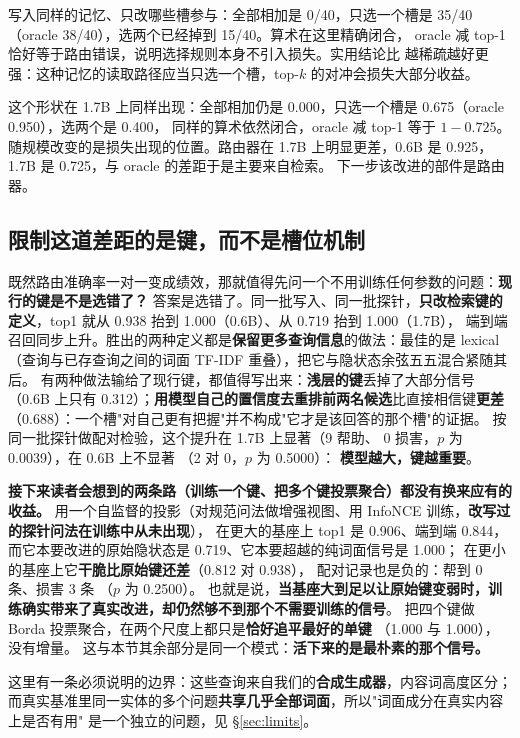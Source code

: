\documentclass[11pt]{ctexart}
\begin{document}
写入同样的记忆、只改哪些槽参与：全部相加是 0/40，只选一个槽是 35/40
（oracle 38/40），选两个已经掉到 15/40。算术在这里精确闭合，
oracle 减 top-1 恰好等于路由错误，说明选择规则本身不引入损失。实用结论比
越稀疏越好更强：这种记忆的读取路径应当只选一个槽，top-$k$ 的对冲会损失大部分收益。

这个形状在 1.7B 上同样出现：全部相加仍是 0.000，只选一个槽是
0.675（oracle 0.950），选两个是 0.400，
同样的算术依然闭合，oracle 减 top-1 等于 $1 - 0.725$。
随规模改变的是损失出现的位置。路由器在 1.7B 上明显更差，0.6B 是 0.925，
1.7B 是 0.725，与 oracle 的差距于是主要来自检索。
下一步该改进的部件是路由器。

\subsection{限制这道差距的是键，而不是槽位机制}
既然路由准确率一对一变成绩效，那就值得先问一个不用训练任何参数的问题：\textbf{现行的键是不是选错了？}
答案是选错了。同一批写入、同一批探针，\textbf{只改检索键的定义}，top1 就从 0.938 抬到
1.000（0.6B）、从 0.719 抬到 1.000（1.7B），
端到端召回同步上升。胜出的两种定义都是\textbf{保留更多查询信息}的做法：最佳的是 lexical
（查询与已存查询之间的词面 TF-IDF 重叠），把它与隐状态余弦五五混合紧随其后。
有两种做法输给了现行键，都值得写出来：\textbf{浅层的键}丢掉了大部分信号（0.6B 上只有
0.312）；\textbf{用模型自己的置信度去重排前两名候选}比直接相信键\textbf{更差}
（0.688）：一个槽"对自己更有把握"并不构成"它才是该回答的那个槽"的证据。
按同一批探针做配对检验，这个提升在 1.7B 上显著（9 帮助、
0 损害，$p$ 为 0.0039），在 0.6B 上不显著
（2 对 0，$p$ 为 0.5000）：
\textbf{模型越大，键越重要}。

\textbf{接下来读者会想到的两条路（训练一个键、把多个键投票聚合）都没有换来应有的收益。}
用一个自监督的投影（对规范问法做增强视图、用 InfoNCE 训练，\textbf{改写过的探针问法在训练中从未出现}），
在更大的基座上 top1 是 0.906、端到端 0.844，
而它本要改进的原始隐状态是 0.719、它本要超越的纯词面信号是 1.000；
在更小的基座上它\textbf{干脆比原始键还差}（0.812 对 0.938），
配对记录也是负的：帮到 0 条、损害 3 条
（$p$ 为 0.2500）。
也就是说，\textbf{当基座大到足以让原始键变弱时，训练确实带来了真实改进，却仍然够不到那个不需要训练的信号}。
把四个键做 Borda 投票聚合，在两个尺度上都只是\textbf{恰好追平最好的单键}
（1.000 与 1.000），没有增量。
这与本节其余部分是同一个模式：\textbf{活下来的是最朴素的那个信号。}

这里有一条必须说明的边界：这些查询来自我们的\textbf{合成生成器}，内容词高度区分；
而真实基准里同一实体的多个问题\textbf{共享几乎全部词面}，所以"词面成分在真实内容上是否有用"
是一个独立的问题，见 §\ref{sec:limits}。
\end{document}
